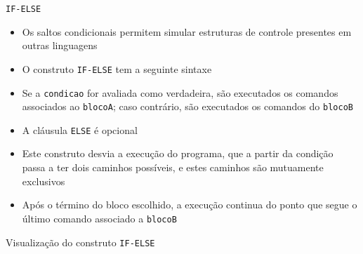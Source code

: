 \begin{frame}[fragile]{\tt IF-ELSE}

    \begin{itemize}
        \item Os saltos condicionais permitem simular estruturas de controle presentes em outras
            linguagens

        \item O construto \texttt{IF-ELSE} tem a seguinte sintaxe


        \item Se a \texttt{condicao} for avaliada como verdadeira, são executados os comandos
            associados ao \texttt{blocoA}; caso contrário, são executados os comandos do
            \texttt{blocoB}

        \item A cláusula \texttt{ELSE} é opcional

        \item Este construto desvia a execução do programa, que a partir da condição passa a
            ter dois caminhos possíveis, e estes caminhos são mutuamente exclusivos

        \item Após o término do bloco escolhido, a execução continua do ponto que segue o último
            comando associado a \texttt{blocoB}
    \end{itemize}

\end{frame}

\begin{frame}[fragile]{Visualização do construto {\tt IF-ELSE}}
    \begin{figure}[ht]
        \centering
    \end{figure}
\end{frame}


